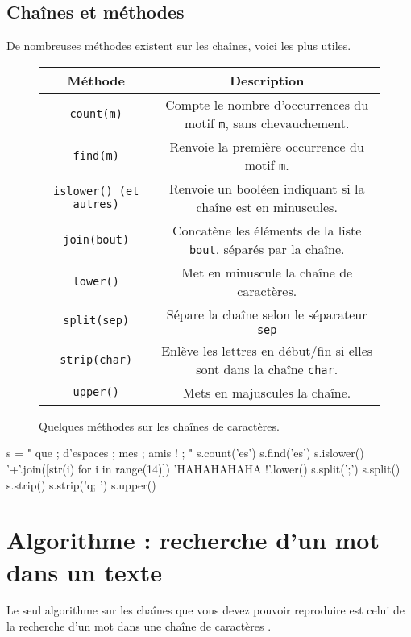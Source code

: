 \subsection{Chaînes et méthodes}
De nombreuses méthodes existent sur les chaînes, voici les plus utiles.
\begin{figure}[!h]
  \begin{center}
    \begin{tabular}{|c|c|}
      \hline
      Méthode & Description \\
      \hline
      \texttt{count(m)}& Compte le nombre d'occurrences du motif \texttt{m}, sans chevauchement.\\
      \hline
      \texttt{find(m)}& Renvoie la première occurrence du motif \texttt{m}.\\
      \hline
      \texttt{islower() (et autres)}& Renvoie un booléen indiquant si la chaîne est en minuscules. \\
      \hline
      \texttt{join(bout)}& Concatène les éléments de la liste \texttt{bout}, séparés par la chaîne.\\
      \hline
      \texttt{lower()}& Met en minuscule la chaîne de caractères.\\
      \hline
      \texttt{split(sep)}& Sépare la chaîne selon le séparateur \texttt{sep}\\
      \hline      
      \texttt{strip(char)}& Enlève les lettres en début/fin si elles sont dans la chaîne \texttt{char}.\\
      \hline
      \texttt{upper()}& Mets en majuscules la chaîne.  \\
      \hline
    \end{tabular}
    \caption{Quelques méthodes sur les chaînes de caractères.}
    \label{tab.str.methodes}
  \end{center}
\end{figure}

\begin{pyconsole}
s = "    que ; d'espaces ; mes ; amis ! ;   "
s.count('es')
s.find('es')
s.islower()
'+'.join([str(i) for i in range(14)])
'HAHAHAHAHA !'.lower()
s.split(';')
s.split()
s.strip()
s.strip('q; ')
s.upper()
\end{pyconsole}

\section{Algorithme : recherche d'un mot dans un texte}

Le seul algorithme sur les chaînes que vous devez pouvoir reproduire est celui de la recherche d'un mot  dans une chaîne de caractères .

